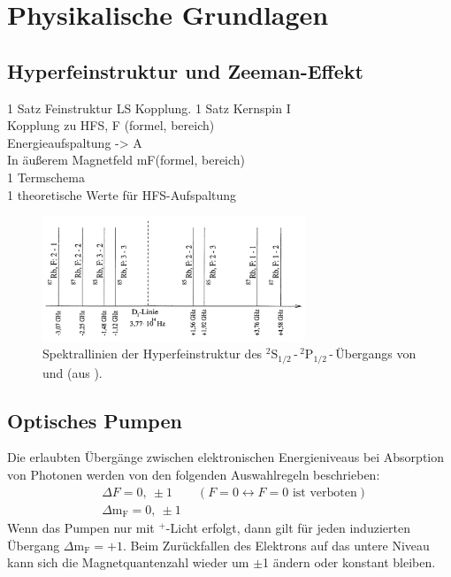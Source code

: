 \section{Physikalische Grundlagen}

\subsection{Hyperfeinstruktur und Zeeman-Effekt}
1 Satz Feinstruktur LS Kopplung. 1 Satz Kernspin I \\
Kopplung zu HFS, F (formel, bereich) \\
Energieaufspaltung -> A \\
In äußerem Magnetfeld mF(formel, bereich) \\
1 Termschema \\
1 theoretische Werte für HFS-Aufspaltung


\begin{figure}[H]
\begin{center}
  \includegraphics[width=0.7\textwidth]{../img/HFSspect_theo.png}
  \caption{Spektrallinien der Hyperfeinstruktur des ${}^2\text{S}_{1/2}$\,-\,${}^2\text{P}_{1/2}$\,-\,Übergangs
  von  und  (aus \cite{manual}).}
  \label{img:hfsspectrum}
\end{center}
\end{figure} 

\subsection{Optisches Pumpen}
Die erlaubten Übergänge zwischen elektronischen Energieniveaus bei Absorption von Photonen
werden von den folgenden Auswahlregeln beschrieben:
\begin{equation}
\begin{split}
  & \Delta F = 0, \ \pm 1 \qquad (F = 0 \leftrightarrow F = 0 \text{ ist verboten}) \\
  & \Delta \text{m}_\text{F} = 0, \ \pm 1
  \end{split}
\end{equation}
Wenn das Pumpen nur mit \textsigma$^+$-Licht erfolgt,
dann gilt für jeden induzierten Übergang \mbox{$\Delta \text{m}_\text{F} = +1$}.
Beim Zurückfallen des Elektrons auf das untere Niveau kann sich die Mag\-net\-quan\-ten\-zahl
wieder um $\pm$1 ändern oder konstant bleiben.

